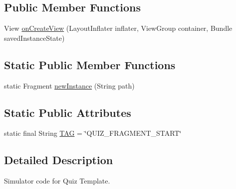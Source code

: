 \subsection*{Public Member Functions}
\begin{DoxyCompactItemize}
\item 
View \hyperlink{classorg_1_1buildmlearn_1_1toolkit_1_1quiztemplate_1_1TFTQuizFragment_a97685d61e8a055acf2b883edfba5a2ad}{on\-Create\-View} (Layout\-Inflater inflater, View\-Group container, Bundle saved\-Instance\-State)
\end{DoxyCompactItemize}
\subsection*{Static Public Member Functions}
\begin{DoxyCompactItemize}
\item 
static Fragment \hyperlink{classorg_1_1buildmlearn_1_1toolkit_1_1quiztemplate_1_1TFTQuizFragment_acd9062634877ea36ccd44914ef8f5e48}{new\-Instance} (String path)
\end{DoxyCompactItemize}
\subsection*{Static Public Attributes}
\begin{DoxyCompactItemize}
\item 
static final String \hyperlink{classorg_1_1buildmlearn_1_1toolkit_1_1quiztemplate_1_1TFTQuizFragment_a7afa4100530fdde30947cc71add19eb8}{T\-A\-G} = \char`\"{}Q\-U\-I\-Z\-\_\-\-F\-R\-A\-G\-M\-E\-N\-T\-\_\-\-S\-T\-A\-R\-T\char`\"{}
\end{DoxyCompactItemize}


\subsection{Detailed Description}
Simulator code for Quiz Template. 

